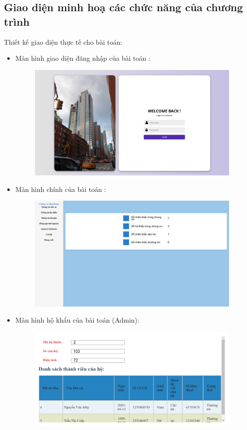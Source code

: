 \documentclass{article}
\begin{document}
\subsection{Giao diện minh hoạ các chức năng của chương trình}
Thiết kế giao diện thực tế cho bài toán:
\begin{itemize}
    \item Màn hình giao diện đăng nhập của bài toán :
    \begin{figure}[H]
        \centering
        \includegraphics[width=1\textwidth]{Ảnh chương 4/Login.png}
    \end{figure}
    \vspace{7cm}
    \item Màn hình chính của bài toán :
    \begin{figure}[H]
        \centering
        \includegraphics[width=1\textwidth]{Ảnh chương 4/Home Admin.png}
    \end{figure}
    \vspace{1cm}
    \item Màn hình hộ khẩu của bài toán (Admin):
    \begin{figure}[H]
        \centering
        \includegraphics[width=1\textwidth]{Ảnh chương 4/Thông tin hộ khẩu Admin.png}

\end{figure}
\end{itemize}
\end{document}
